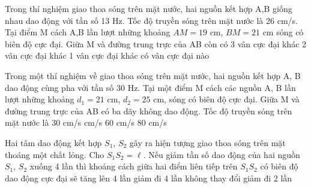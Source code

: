 \begin{ex}%
Trong thí nghiệm giao thoa sóng trên mặt nước, hai nguồn kết hợp A,B giống nhau dao động với tần số 13 Hz. Tốc độ truyền sóng trên mặt nước là 26 cm/s. Tại điểm M cách A,B lần lượt những khoảng $AM=19$ cm, $BM=21$ cm sóng có biên độ cực đại. Giữa M và đường trung trực của AB còn có
\choice
{3 vân cực đại khác}
{2 vân cực đại khác}
{1 vân cực đại khác}
{ có vân cực đại nào}
\end{ex} 
\begin{ex}%
Trong một thí nghiệm về giao thoa sóng trên mặt nước, hai nguồn kết hợp A, B dao động cùng pha với tần số 30 Hz. Tại một điểm M cách các nguồn A, B lần lượt những khoảng $d_1 = 21$ cm, $d_2 = 25$ cm, sóng có biên độ cực đại. Giữa M và đường trung trực của AB có ba dãy không dao động. Tốc độ truyền sóng trên mặt nước là
\choice
{30 cm/s}
{ cm/s}
{60 cm/s}
{80 cm/s}
\end{ex} 
\begin{ex}%
Hai tâm dao động kết hợp $S_1$, $S_2$ gây ra hiện tượng giao thoa sóng trên mặt thoáng một chất lỏng. Cho $S_1S_2 =\ell$. Nếu giảm tần số dao động của hai nguồn $S_1$, $S_2$ xuống 4 lần thì khoảng cách giữa hai điểm liên tiếp trên $S_1S_2$ có biên độ dao động cực đại sẽ
\choice
{\True tăng lên 4 lần}
{giảm đi 4 lần}
{không thay đổi}
{giảm đi 2 lần}
\end{ex} 
